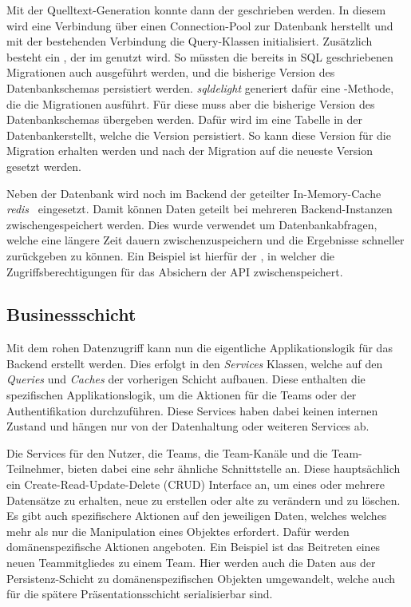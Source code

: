Mit der Quelltext-Generation konnte dann der  geschrieben werden. In diesem
wird eine Verbindung über einen Connection-Pool zur Datenbank herstellt und mit der bestehenden Verbindung
die Query-Klassen initialisiert. Zusätzlich besteht ein , der im 
genutzt wird. So müssten die bereits in SQL geschriebenen Migrationen auch ausgeführt werden, und die bisherige
Version des Datenbankschemas persistiert werden. \emph{sqldelight} generiert dafür eine -Methode,
die die Migrationen ausführt. Für diese muss aber die bisherige Version des Datenbankschemas übergeben werden.
Dafür wird im  eine Tabelle in der Datenbankerstellt, welche die Version persistiert.
So kann diese Version für die Migration erhalten werden und nach der Migration auf die neueste Version gesetzt werden.

Neben der Datenbank wird noch im Backend der geteilter In-Memory-Cache \emph{redis}~\cite{redis} eingesetzt.
Damit können Daten geteilt bei mehreren Backend-Instanzen zwischengespeichert werden. Dies wurde verwendet um
Datenbankabfragen, welche eine längere Zeit dauern zwischenzuspeichern und die Ergebnisse schneller zurückgeben
zu können. Ein Beispiel ist hierfür der , in welcher die Zugriffsberechtigungen für
das Absichern der API zwischenspeichert.

\subsection{Businessschicht}

Mit dem rohen Datenzugriff kann nun die eigentliche Applikationslogik für das
Backend erstellt werden. Dies erfolgt in den \emph{Services} Klassen, welche
auf den \emph{Queries} und \emph{Caches} der vorherigen Schicht aufbauen. Diese enthalten die
spezifischen Applikationslogik, um \zb{} die Aktionen für die Teams oder der
Authentifikation durchzuführen. Diese Services haben dabei keinen
internen Zustand und hängen nur von der Datenhaltung oder weiteren Services ab.

Die Services für den Nutzer, die Teams, die Team-Kanäle und die Team-Teilnehmer, bieten dabei
eine sehr ähnliche Schnittstelle an. Diese hauptsächlich ein Create-Read-Update-Delete (CRUD)
Interface an, um eines oder mehrere Datensätze zu erhalten, neue zu erstellen
oder alte zu verändern und zu löschen. Es gibt auch spezifischere Aktionen auf den jeweiligen
Daten, welches \zb{} welches mehr als nur die Manipulation eines Objektes
erfordert. Dafür werden domänenspezifische Aktionen angeboten. Ein Beispiel ist das Beitreten
eines neuen Teammitgliedes zu einem Team. Hier werden auch die Daten aus der Persistenz-Schicht
zu domänenspezifischen Objekten umgewandelt, welche auch für die spätere Präsentationsschicht
serialisierbar sind.

